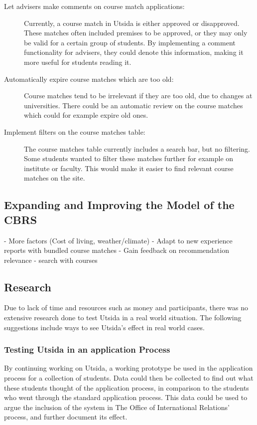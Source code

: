 \begin{description}
    \item[Let advisers make comments on course match applications:] Currently, a course match in Utsida is either approved or disapproved. These matches often included premises to be approved, or they may only be valid for a certain group of students. By implementing a comment functionality for advisers, they could denote this information, making it more useful for students reading it.
    \item[Automatically expire course matches which are too old:] Course matches tend to be irrelevant if they are too old, due to changes at universities. There could be an automatic review on the course matches which could for example expire old ones.
    \item[Implement filters on the course matches table:] The course matches table currently includes a search bar, but no filtering. Some students wanted to filter these matches further for example on institute or faculty. This would make it easier to find relevant course matches on the site.
\end{description}

\subsection{Expanding and Improving the Model of the CBRS}
- More factors (Cost of living, weather/climate)
- Adapt to new experience reports with bundled course matches
- Gain feedback on recommendation relevance
- search with courses

\subsection{Research}
Due to lack of time and resources such as money and participants, there was no extensive research done to test Utsida in a real world situation. The following suggestions include ways to see Utsida's effect in real world cases.

\subsubsection{Testing Utsida in an application Process}
By continuing working on Utsida, a working prototype be used in the application process for a collection of students. Data could then be collected to find out what these students thought of the application process, in comparison to the students who went through the standard application process. This data could be used to argue the inclusion of the system in The Office of International Relations' process, and further document its effect.


